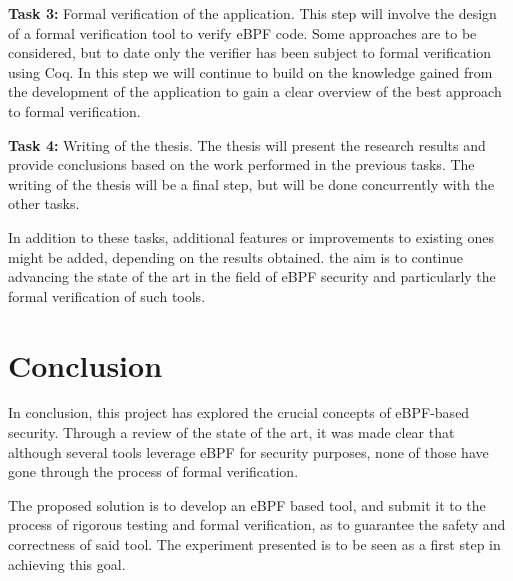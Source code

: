 \textbf{Task 3:} Formal verification of the application. This step will involve the design of a formal verification tool to verify eBPF code. Some approaches are to be considered, but to date only the verifier has been subject to formal verification using Coq. In this step we will continue to build on the knowledge gained from the development of the application to gain a clear overview of the best approach to formal verification. 

\textbf{Task 4:} Writing of the thesis. The thesis will present the research results and provide conclusions based on the work performed in the previous tasks. The writing of the thesis will be a final step, but will be done concurrently with the other tasks.

In addition to these tasks, additional features or improvements to existing ones might be added, depending on the results obtained. the aim is to continue advancing the state of the art in the field of eBPF security and particularly the formal verification of such tools.


\section{Conclusion}
In conclusion, this project has explored the crucial concepts of eBPF-based security. Through a review of the state of the art, it was made clear that although several tools leverage eBPF for security purposes, none of those have gone through the process of formal verification. 

The proposed solution is to develop an eBPF based tool, and submit it to the process of rigorous testing and formal verification, as to guarantee the safety and correctness of said tool. The experiment presented is to be seen as a first step in achieving this goal. 


